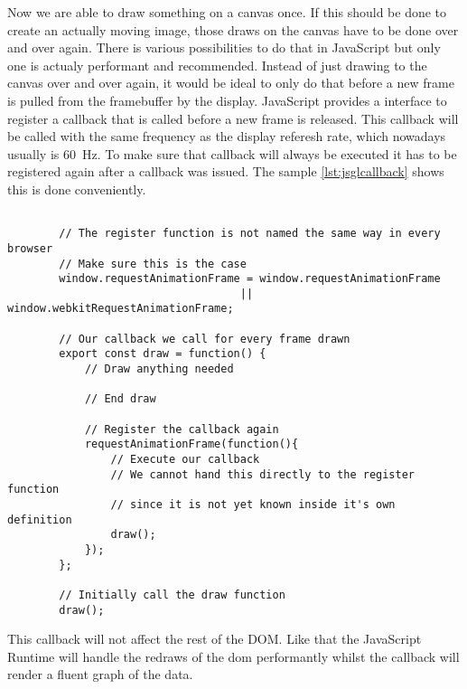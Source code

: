 Now we are able to draw something on a canvas once. If this should be done to create an actually moving image, those draws on the canvas have to be done over and over again. There is various possibilities to do that in JavaScript but only one is actualy performant and recommended. Instead of just drawing to the canvas over and over again, it would be ideal to only do that before a new frame is pulled from the framebuffer by the display. JavaScript provides a interface to register a callback that is called before a new frame is released. This callback will be called with the same frequency as the display referesh rate, which nowadays usually is \SI{60}{\hertz}.
To make sure that callback will always be executed it has to be registered again after a callback was issued. The sample \ref{lst:jsglcallback} shows this is done conveniently.

\begin{tcolorbox}[
        title={
            \refstepcounter{listing}
            Listing \thelisting: JavaScript ``Get 2D Rendering Context''
            \label{lst:js2dcontext}
            \addcontentsline{lol}{listing}{\protect\numberline{\thelisting}}
        }
    ]
    \begin{verbatim}

        // The register function is not named the same way in every browser
        // Make sure this is the case
        window.requestAnimationFrame = window.requestAnimationFrame
                                    || window.webkitRequestAnimationFrame;

        // Our callback we call for every frame drawn
        export const draw = function() {
            // Draw anything needed

            // End draw

            // Register the callback again
            requestAnimationFrame(function(){
                // Execute our callback
                // We cannot hand this directly to the register function
                // since it is not yet known inside it's own definition
                draw();
            });
        };

        // Initially call the draw function
        draw();
    \end{verbatim}
\end{tcolorbox}

This callback will not affect the rest of the DOM. Like that the JavaScript Runtime will handle the redraws of the dom performantly whilst the callback will render a fluent graph of the data.

